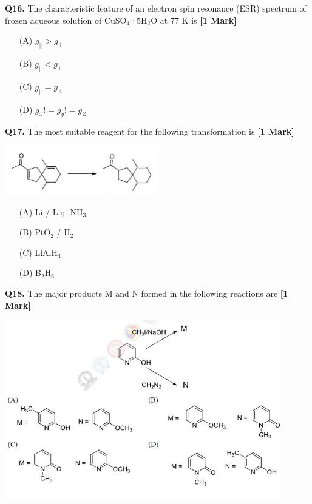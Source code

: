 \documentclass[11pt]{article}
\newcommand{\questiona}[2]{
    \noindent\textbf{Q#2.} #1 \hfill \textbf{[1 Mark]}
}
\begin{document}
\questiona{The characteristic feature of an electron spin resonance (ESR) spectrum of frozen aqueous solution of CuSO\(_4\)·5H\(_2\)O at 77 K is}{16}
\begin{enumerate}
    \item[(A)] \( g_{\parallel} > g_{\perp} \)
    \item[(B)] \( g_{\parallel} < g_{\perp} \)
    \item[(C)] \( g_{\parallel} = g_{\perp} \)
    \item[(D)] $ g_{x} != g_y != g_Z$
\end{enumerate}
\vspace{0.5cm}

\questiona{The most suitable reagent for the following transformation is}{17}
\begin{center}
\includegraphics[width=0.5\textwidth]{figures/17.png}
\end{center}
\begin{enumerate}
    \item[(A)] Li / Liq. NH\(_3\)
    \item[(B)] PtO\(_2\) / H\(_2\)
    \item[(C)] LiAlH\(_4\)
    \item[(D)] B\(_2\)H\(_6\)
\end{enumerate}
\vspace{0.5cm}

\questiona{The major products M and N formed in the following reactions are}{18}
\begin{center}
\includegraphics[width=0.9\textwidth]{figures/18.png}
\end{center}
\end{document}
